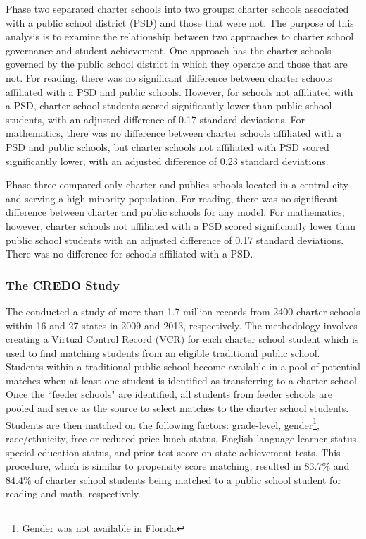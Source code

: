\documentclass[letterpaper,12pt]{article} %
\begin{document}
Phase two separated charter schools into two groups: charter schools associated with a public school district (PSD) and those that were not. The purpose of this analysis is to examine the relationship between two approaches to charter school governance and student achievement. One approach has the charter schools governed by the public school district in which they operate and those that are not. For reading, there was no significant difference between charter schools affiliated with a PSD and public schools. However, for schools not affiliated with a PSD, charter school students scored significantly lower than public school students, with an adjusted difference of 0.17 standard deviations. For mathematics, there was no difference between charter schools affiliated with a PSD and public schools, but charter schools not affiliated with PSD scored significantly lower, with an adjusted difference of 0.23 standard deviations.

Phase three compared only charter and publics schools located in a central city and serving a high-minority population. For reading, there was no significant difference between charter and public schools for any model. For mathematics, however, charter schools not affiliated with a PSD scored significantly lower than public school students with an adjusted difference of 0.17 standard deviations. There was no difference for schools affiliated with a PSD. 


\subsubsection{The CREDO Study}

The  conducted a study of more than 1.7 million records from 2400 charter schools within 16 and 27 states in 2009 and 2013, respectively. The methodology involves creating a Virtual Control Record (VCR) for each charter school student \cite<see also,>{AbadieDiamondHainueller2007,nea} which is used to find matching students from an eligible traditional public school. Students within a traditional public school become available in a pool of potential matches when at least one student is identified as transferring to a charter school. Once the ``feeder schools" are identified, all students from feeder schools are pooled and serve as the source to select matches to the charter school students. Students are then matched on the following factors: grade-level, gender\footnote{Gender was not available in Florida}, race/ethnicity, free or reduced price lunch status, English language learner status, special education status, and prior test score on state achievement tests. This procedure, which is similar to propensity score matching, resulted in 83.7\% and 84.4\% of charter school students being matched to a public school student for reading and math, respectively.
\end{document}
